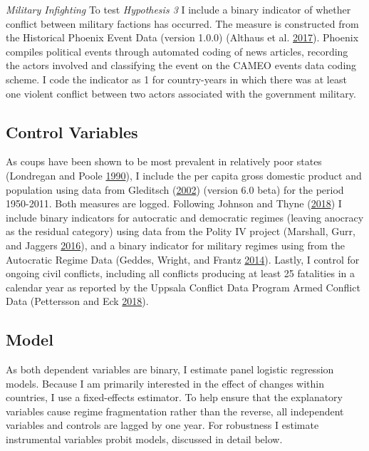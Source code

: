 \documentclass[12pt,]{article}
\theoremstyle{definition}
\theoremstyle{definition}
\theoremstyle{definition}
\theoremstyle{remark}
\begin{document}
\emph{Military Infighting} To test \emph{Hypothesis 3} I include a
binary indicator of whether conflict between military factions has
occurred. The measure is constructed from the Historical Phoenix Event
Data (version 1.0.0) (Althaus et al.
\protect\hyperlink{ref-Althaus2017}{2017}). Phoenix compiles political
events through automated coding of news articles, recording the actors
involved and classifying the event on the CAMEO events data coding
scheme. I code the indicator as 1 for country-years in which there was
at least one violent conflict between two actors associated with the
government military.

\hypertarget{control-variables}{%
\subsection{Control Variables}\label{control-variables}}

As coups have been shown to be most prevalent in relatively poor states
(Londregan and Poole \protect\hyperlink{ref-Londregan1990}{1990}), I
include the per capita gross domestic product and population using data
from Gleditsch (\protect\hyperlink{ref-Gleditsch2002a}{2002}) (version
6.0 beta) for the period 1950-2011. Both measures are logged. Following
Johnson and Thyne (\protect\hyperlink{ref-Johnson2018}{2018}) I include
binary indicators for autocratic and democratic regimes (leaving
anocracy as the residual category) using data from the Polity IV project
(Marshall, Gurr, and Jaggers
\protect\hyperlink{ref-Marshall2016}{2016}), and a binary indicator for
military regimes using from the Autocratic Regime Data (Geddes, Wright,
and Frantz \protect\hyperlink{ref-Geddes2014a}{2014}). Lastly, I control
for ongoing civil conflicts, including all conflicts producing at least
25 fatalities in a calendar year as reported by the Uppsala Conflict
Data Program Armed Conflict Data (Pettersson and Eck
\protect\hyperlink{ref-Pettersson2018}{2018}).

\hypertarget{model}{%
\subsection{Model}\label{model}}

As both dependent variables are binary, I estimate panel logistic
regression models. Because I am primarily interested in the effect of
changes within countries, I use a fixed-effects estimator. To help
ensure that the explanatory variables cause regime fragmentation rather
than the reverse, all independent variables and controls are lagged by
one year. For robustness I estimate instrumental variables probit
models, discussed in detail below.
\end{document}

